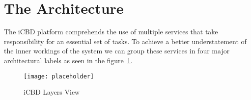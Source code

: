 \section{The Architecture} %
\label{sec:icbd_architecture}


The iCBD platform comprehends the use of multiple services that take responsibility for an essential set of tasks. To achieve a better understatement of the inner workings of the system we can group these services in four major architectural labels as seen in the figure~\ref{fig:icbd_layers}.


\begin{figure}[htbp]
	\centering
	\texttt{[image: placeholder]}
	\caption{iCBD Layers View}
	\label{fig:icbd_layers}
\end{figure}


